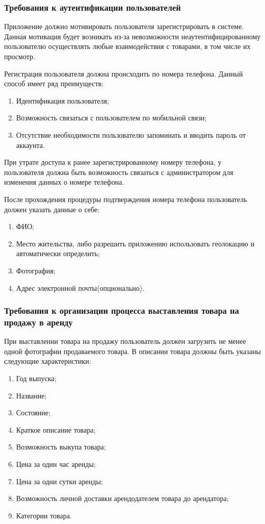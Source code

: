 \subsubsection{Требования к аутентификации пользователей}\hfill

Приложение должно мотивировать пользователя зарегистрировать в системе.
Данная мотивация будет возникать из-за невозможности неаутентифицированному пользователю осуществлять любые взаимодействия с товарами, в том числе их просмотр.

Регистрация пользователя должна происходить по номера телефона. Данный способ имеет ряд преимуществ:
\begin{enumerate}[label=\arabic*)]
    \item Идентификация пользователя;
    \item Возможность связаться с пользователем по мобильной связи;
    \item Отсутствие необходимости пользователю запоминать и вводить пароль от аккаунта.
\end{enumerate}

При утрате доступа к ранее зарегистрированному номеру телефона, у пользователя должна быть возможность связаться с администратором для изменения данных о номере телефона.

После прохождения процедуры подтверждения номера телефона пользователь должен указать данные о себе:
\begin{enumerate}[label=\arabic*)]
    \item ФИО;
    \item Место жительства, либо разрешить приложению использовать геолокацию и автоматически определить;
    \item Фотография;
    \item Адрес электронной почты(опционально).
\end{enumerate}

\subsubsection{Требования к организации процесса выставления товара на продажу в аренду}\hfill

При выставлении товара на продажу пользователь должен загрузить не менее одной фотографии продаваемого товара.
В описании товара должны быть указаны следующие характеристики:
\begin{enumerate}[label=\arabic*)]
    \item Год выпуска;
    \item Название;
    \item Состояние;
    \item Краткое описание товара;
    \item Возможность выкупа товара;
    \item Цена за один час аренды;
    \item Цена за одни сутки аренды;
    \item Возможность личной доставки арендодателем товара до арендатора;
    \item Категории товара.
\end{enumerate}

